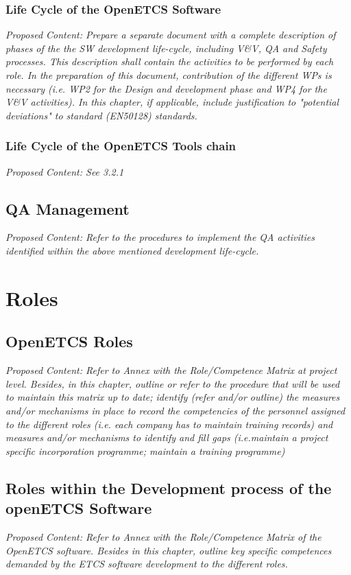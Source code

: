 \documentclass{template/openetcs_article}
\begin{document}
\subsubsection{Life Cycle of the OpenETCS Software}
\textit{Proposed Content: Prepare a separate document with a complete description of phases of the the SW development life-cycle, including V\&V, QA and Safety processes. This description shall contain the activities to be performed by each role.
In the preparation of this document, contribution of the different WPs is necessary (i.e. WP2 for the Design and development phase and WP4 for the V\&V activities).
In this chapter, if applicable, include justification to "potential deviations" to standard (EN50128) standards.}

\subsubsection{Life Cycle of the OpenETCS Tools chain}
\textit{Proposed Content: See 3.2.1}

\subsection{QA Management }
\textit{Proposed Content: Refer to the procedures to implement the QA activities identified within the above mentioned development life-cycle. }


\section{Roles}
\subsection{OpenETCS Roles}
\textit{Proposed Content: Refer to Annex with the Role/Competence Matrix at project level.
Besides, in this chapter,  outline or refer to the procedure that will be used to maintain this matrix up to date; identify (refer and/or outline) the measures and/or mechanisms in place to record the competencies of the personnel assigned to the different roles (i.e. each company has to maintain training records) and measures and/or mechanisms to identify and fill gaps (i.e.maintain a project specific incorporation programme; maintain a training programme)}

\subsection{Roles within the Development process of the openETCS Software}
\textit{Proposed Content: Refer to Annex with the Role/Competence Matrix of the OpenETCS software. 
Besides in this chapter, outline key specific competences demanded by the ETCS software development to the different roles.}
\end{document}
